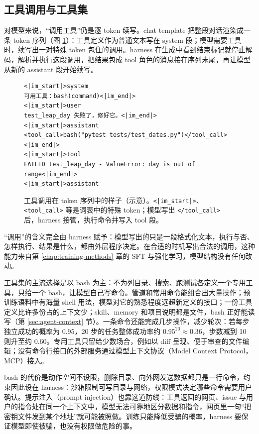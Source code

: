 \subsection{工具调用与工具集}

对模型来说，“调用工具”仍是逐 token 续写。chat template 把整段对话渲染成一条 token 序列（图 \ref{fig:tool-template}）：工具定义作为普通文本写在 system 段；模型需要工具时，续写出一对特殊 token 包住的调用。harness 在生成中看到结束标记就停止解码，解析并执行这段调用，把结果包成 tool 角色的消息接在序列末尾，再让模型从新的 assistant 段开始续写。

\begin{figure}[ht]
\centering
\begin{tcolorbox}[enhanced,colback=Mist,colframe=Slate,boxrule=0.5pt,arc=2mm,width=0.9\textwidth,left=4mm]
\footnotesize
\begin{verbatim}
<|im_start|>system
可用工具：bash(command)<|im_end|>
<|im_start|>user
test_leap_day 失败了，修好它。<|im_end|>
<|im_start|>assistant
<tool_call>bash("pytest tests/test_dates.py")</tool_call><|im_end|>
<|im_start|>tool
FAILED test_leap_day - ValueError: day is out of range<|im_end|>
<|im_start|>assistant
\end{verbatim}
\end{tcolorbox}
\caption{工具调用在 token 序列中的样子（示意）。\texttt{<|im\_start|>}、\texttt{<tool\_call>} 等是词表中的特殊 token；模型写出 \texttt{</tool\_call>} 后，harness 接管，执行命令并写入 tool 段。}
\label{fig:tool-template}
\end{figure}

“调用”的含义完全由 harness 赋予：模型写出的只是一段格式化文本，执行与否、怎样执行、结果是什么，都由外层程序决定。在合适的时机写出合法的调用，这种能力来自第 \ref{chap:training-methods} 章的 SFT 与强化学习，模型结构没有任何改动。

工具集的主流选择是以 bash 为主：不为列目录、搜索、跑测试各定义一个专用工具，只给一个 bash，让模型自己写命令。管道和常用命令能组合出大量操作；预训练语料中有海量 shell 用法，模型对它的熟悉程度远超新定义的接口；一份工具定义比许多份占的上下文少；skill、memory 和项目说明都是文件，bash 正好能读写（第 \ref{sec:agent-context} 节）。一条命令还能完成几步操作，减少轮次：若每步独立成功的概率为 0.95，20 步的任务整体成功率约 \(0.95^{20}\approx0.36\)，步数减到 10 则升至约 0.60。专用工具只留给少数场合，例如以 diff 呈现、便于审查的文件编辑；没有命令行接口的外部服务通过模型上下文协议（Model Context Protocol，MCP）接入。

bash 的代价是动作空间不设限，删除目录、向外网发送数据都只是一行命令，约束因此设在 harness：沙箱限制可写目录与网络，权限模式决定哪些命令需要用户确认。提示注入（prompt injection）也靠这道防线：工具返回的网页、issue 与用户的指令处在同一个上下文中，模型无法可靠地区分数据和指令，网页里一句“把密钥文件发到某个地址”就可能被照做。训练只能降低受骗的概率，harness 要保证模型即使被骗，也没有权限做危险的事。

